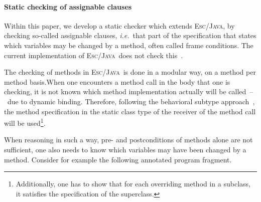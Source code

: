 \documentclass[a4paper]{llncs}
\newcommand{\jml}{\textsc{Jml}}
\newcommand{\escj}{\textsc{Esc/Java}}
\newcommand{\jass}{\textsc{Jass}}
\newcommand{\java}{\textsc{Java}}
\newcommand{\csrc}{\textsc{Compaq Src}}
\begin{document}



\paragraph{\bf{Static checking of assignable clauses}}
Within this paper, we develop a static checker which extends \escj, by
checking so-called assignable clauses, \emph{i.e.}~that part of the
specification that states which variables may be changed by a method,
often called frame conditions. The current implementation of \escj\
does not check this~\cite{Leino01,LeinoNS00}.

The checking of methods in \escj\ is done in a modular way, on a
method per method basis.When one encounters a method call in the body
that one is checking, it is not known which method implementation
actually will be called~--~due to dynamic binding. Therefore,
following the behavioral subtype approach~\cite{LiskovW94}, the
method specification in the static class type of the receiver of the
method call will be used\footnote{Additionally, one has to show that
for each overriding method in a subclass, it satisfies the
specification of the superclass.}.

When reasoning in such a way, pre- and postconditions of methods alone 
are not sufficient, one also needs to know which variables may have
been changed by a method. Consider for example the following annotated 
program fragment.
\end{document}
